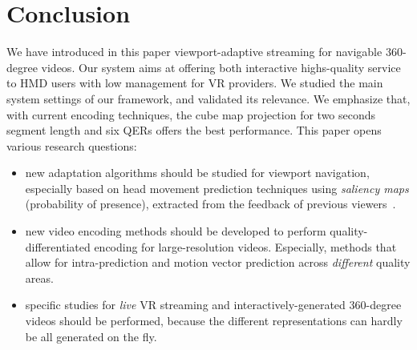 \section{Conclusion}
\label{sec:conclusion}

We have introduced in this paper viewport-adaptive streaming for
navigable $360$-degree videos. Our system aims at offering both
interactive highs-quality service to \ac{HMD} users with low management
for \ac{VR} providers.
We studied the main system
settings of our framework, and validated its relevance.
We emphasize that, with current encoding techniques, the cube
map projection for two seconds segment length and six
\acp{QER} offers the best performance. This
paper opens various research questions:
\begin{itemize}
  \item new adaptation algorithms should be studied for viewport navigation,
especially based on head movement prediction techniques using \emph{saliency maps} (probability of
presence), extracted from the feedback of
previous viewers~\cite{han2014spatial}.

  \item new video encoding methods should be
developed to perform quality-differentiated encoding for
large-resolution videos. Especially, methods that allow for
intra-prediction and motion vector prediction across \emph{different} quality
areas.
\item specific studies for \emph{live} \ac{VR} streaming
and interactively-generated $360$-degree videos should be performed,
because the different representations can hardly be all
generated on the fly.
\end{itemize}

